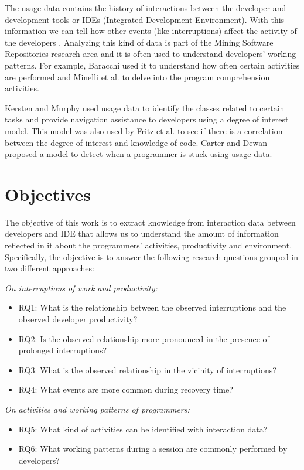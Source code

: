 The usage data contains the history of interactions between the developer and development tools or IDEs (Integrated Development Environment). With this information we can tell how other events (like interruptions) affect the activity of the developers \cite{SnipesETALASD}. Analyzing this kind of data is part of the Mining Software Repositories research area \cite{H04} and it is often used to understand developers' working patterns. For example, Baracchi \cite{B14} used it to understand how often certain activities are performed and Minelli et al. \cite{MMLK14} to delve into the program comprehension activities.

Kersten and Murphy \cite{KM06} used usage data to identify the classes related to certain tasks and provide navigation assistance to developers using a degree of interest model. This model was also used by Fritz et al. \cite{FMH07} to see if there is a correlation between the degree of interest and knowledge of code. Carter and Dewan \cite{CD10} proposed a model to detect when a programmer is stuck using usage data.



\section{Objectives}
The objective of this work is to extract knowledge from interaction data between developers and IDE that allows us to understand the amount of information reflected in it about the programmers' activities, productivity and environment. Specifically, the objective is to answer the following research questions grouped in two different approaches: 

\emph{On interruptions of work and productivity:}
\begin{itemize}
	\item RQ1: What is the relationship between the observed interruptions and the observed developer productivity?
	\item RQ2: Is the observed relationship more pronounced in the presence of prolonged interruptions?
	\item RQ3: What is the observed relationship in the vicinity of interruptions?
	\item RQ4: What events are more common during recovery time?
\end{itemize}

\emph{On activities and working patterns of programmers:}
\begin{itemize}
	\item RQ5: What kind of activities can be identified with interaction data?
	\item RQ6: What working patterns during a session are commonly performed by developers?
\end{itemize}

